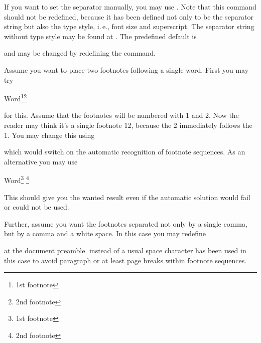 If you want to set the separator manually, you may use
. Note that this command should not be
redefined, because it has been defined not only to be the separator string but
also the type style, i.\,e., font size and superscript. The separator string
without type style may be found at . The
predefined default is
\begin{lstcode}[belowskip=\dp\strutbox]
  \newcommand*{\multfootsep}{,}
\end{lstcode}
and may be changed by redefining the command.

\ifCommonscrlttr\else
\begin{Example}
  \label{desc:maincls.cmd.footnote.example}%
  Assume you want to place two footnotes following a single word. First you may try
\begin{lstcode}
  Word\footnote{1st footnote}\footnote{2nd footnote}
\end{lstcode}
  for this. Assume that the footnotes will be numbered with 1 and 2. Now the
  reader may think it's a single footnote 12, because the 2
  immediately follows the 1. You may change this using
\begin{lstcode}
\end{lstcode}
  which would switch on the automatic recognition of footnote sequences. As an
  alternative you may use
\begin{lstcode}
  Word\footnote{1st footnote}%
  \multiplefootnoteseparator
  \footnote{2nd footnote}
\end{lstcode}
  This should give you the wanted result even if the automatic solution would
  fail or could not be used.

  Further, assume you want the footnotes separated not only by a single
  comma, but by a comma and a white space. In this case you may redefine
\begin{lstcode}
  \renewcommand*{\multfootsep}{,\nobreakspace}
\end{lstcode}
  at the document preamble. 
  instead of a usual space character has been used in this case to avoid
  paragraph or at least page breaks within footnote sequences.
\end{Example}%
\fi%
%
%
%
%
%
%

